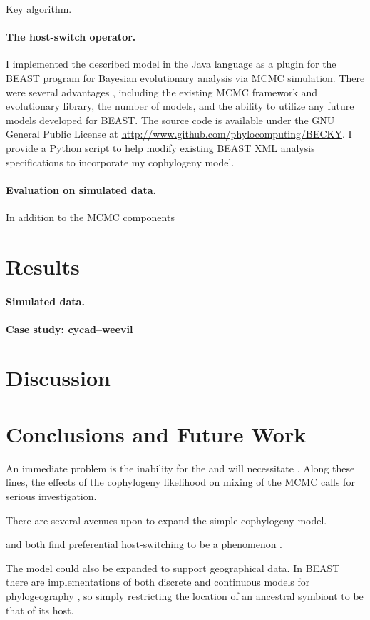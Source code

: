 \documentclass[12pt,letterpaper]{article}
\begin{document}
\begin{algorithm}
\caption{Key algorithm.}
\end{algorithm}

\paragraph*{The host-switch operator.}

I implemented the described model in the Java language as a plugin for the BEAST program \parencite{Drummond:2012} for Bayesian evolutionary analysis via \ac{MCMC} simulation. There were several advantages , including  the existing \ac{MCMC} framework and evolutionary library, the number of models, and the ability to utilize any future models developed for BEAST. The source code is available under the GNU General Public License at \url{http://www.github.com/phylocomputing/BECKY}. I provide a Python script to help modify existing BEAST XML analysis specifications to incorporate my cophylogeny model.

\paragraph*{Evaluation on simulated data.}
In addition to the MCMC components

\section*{Results}

\paragraph*{Simulated data.}

\paragraph*{Case study: cycad--weevil}

\section*{Discussion}

\section*{Conclusions and Future Work}

An immediate problem is the inability for the and will necessitate . Along these lines, the effects of the cophylogeny likelihood on mixing of the \ac{MCMC} calls for serious investigation. 

There are several avenues upon to expand the simple cophylogeny model. 

\textcite{Charleston:2002} and \textcite{Faria:2013} both find preferential host-switching to be a phenomenon . 

The model could also be expanded to support geographical data. In BEAST there are implementations of both discrete and continuous models for phylogeography \parencites{Lemey:2009}{Lemey:2010}, so simply restricting the location of an ancestral symbiont to be that of its host.

\printbibliography
\end{document}
